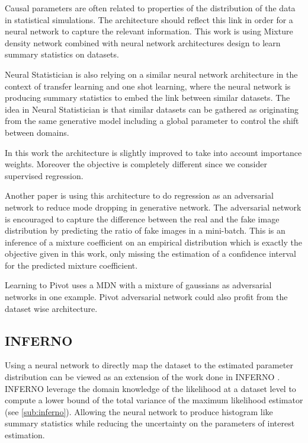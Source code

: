 Causal parameters are often related to properties of the distribution of the data in statistical simulations.
The architecture should reflect this link in order for a neural network to capture the relevant information.
This work is using Mixture density network \cite{Bishop94mixturedensity} combined with neural network architectures design to learn summary statistics on datasets.

Neural Statistician \cite{Edwards17neuralstatistician} is also relying on a similar neural network architecture in the context of transfer learning and one shot learning, where the neural network is producing summary statistics to embed the link between similar datasets.
The idea in Neural Statistician is that similar datasets can be gathered as originating from the same generative model including a global parameter to control the shift between domains.

In this work the architecture is slightly improved to take into account importance weights.
Moreover the objective is completely different since we consider supervised regression.


Another paper \cite{lucas:hal-01791126} is using this architecture to do regression as an adversarial network to reduce mode dropping in generative network.
The adversarial network is encouraged to capture the difference between the real and the fake image distribution by predicting the ratio of fake images in a mini-batch.
This is an inference of a mixture coefficient on an empirical distribution which is exactly the objective given in this work, only missing the estimation of a confidence interval for the predicted mixture coefficient.

Learning to Pivot \cite{louppe_learning_2016} uses a MDN with a mixture of gaussians as adversarial networks in one example.
Pivot adversarial network could also profit from the dataset wise architecture.




\subsection{INFERNO} %
\label{sub:inferno}

Using a neural network to directly map the dataset to the estimated parameter distribution can be viewed as an extension of the work done in INFERNO \cite{DECASTRO2019170inferno}. 
INFERNO leverage the domain knowledge of the likelihood at a dataset level to compute a lower bound of the total variance of the maximum likelihood estimator (see \autoref{sub:inferno}).
Allowing the neural network to produce histogram like summary statistics while reducing the uncertainty on the parameters of interest estimation.

